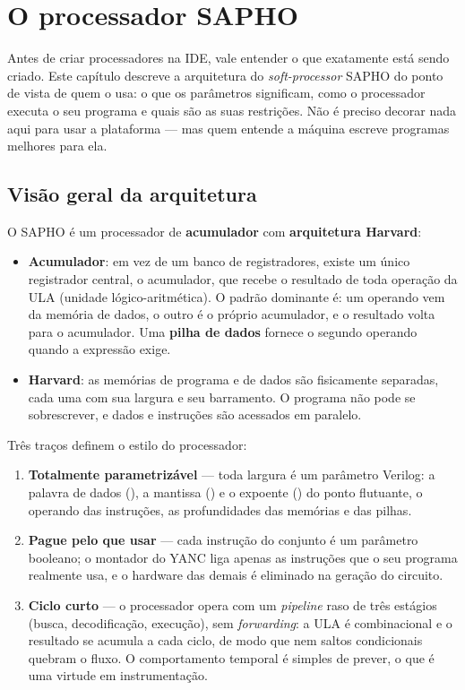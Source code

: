 \chapter{O processador SAPHO}
\label{cap:processador-sapho}

Antes de criar processadores na IDE, vale entender o que exatamente está sendo criado. Este capítulo descreve a arquitetura do \emph{soft-processor} SAPHO do ponto de vista de quem o usa: o que os parâmetros significam, como o processador executa o seu programa e quais são as suas restrições. Não é preciso decorar nada aqui para usar a plataforma --- mas quem entende a máquina escreve programas melhores para ela.

\section{Visão geral da arquitetura}

O SAPHO é um processador de \textbf{acumulador} com \textbf{arquitetura Harvard}:

\begin{itemize}
  \item \textbf{Acumulador}: em vez de um banco de registradores, existe um único registrador central, o acumulador, que recebe o resultado de toda operação da ULA (unidade lógico-aritmética). O padrão dominante é: um operando vem da memória de dados, o outro é o próprio acumulador, e o resultado volta para o acumulador. Uma \textbf{pilha de dados} fornece o segundo operando quando a expressão exige.
  \item \textbf{Harvard}: as memórias de programa e de dados são fisicamente separadas, cada uma com sua largura e seu barramento. O programa não pode se sobrescrever, e dados e instruções são acessados em paralelo.
\end{itemize}

Três traços definem o estilo do processador:

\begin{enumerate}
  \item \textbf{Totalmente parametrizável} --- toda largura é um parâmetro Verilog: a palavra de dados (), a mantissa () e o expoente () do ponto flutuante, o operando das instruções, as profundidades das memórias e das pilhas.
  \item \textbf{Pague pelo que usar} --- cada instrução do conjunto é um parâmetro booleano; o montador do YANC liga apenas as instruções que o seu programa realmente usa, e o hardware das demais é eliminado na geração do circuito.
  \item \textbf{Ciclo curto} --- o processador opera com um \emph{pipeline} raso de três estágios (busca, decodificação, execução), sem \emph{forwarding}: a ULA é combinacional e o resultado se acumula a cada ciclo, de modo que nem saltos condicionais quebram o fluxo. O comportamento temporal é simples de prever, o que é uma virtude em instrumentação.
\end{enumerate}

